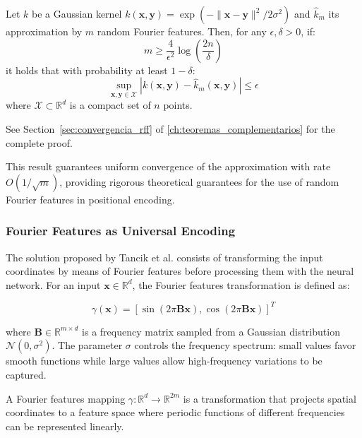 \begin{theorem}
Let $k$ be a Gaussian kernel $k(\mathbf{x}, \mathbf{y}) = \exp(-\|\mathbf{x} - \mathbf{y}\|^2 / 2\sigma^2)$ and $\hat{k}_m$ its approximation by $m$ random Fourier features. Then, for any $\epsilon, \delta > 0$, if:
\begin{equation}
m \geq \frac{4}{\epsilon^2} \log\left(\frac{2n}{\delta}\right)
\end{equation}
it holds that with probability at least $1 - \delta$:
\begin{equation}
\sup_{\mathbf{x}, \mathbf{y} \in \mathcal{X}} |k(\mathbf{x}, \mathbf{y}) - \hat{k}_m(\mathbf{x}, \mathbf{y})| \leq \epsilon
\end{equation}
where $\mathcal{X} \subset \mathbb{R}^d$ is a compact set of $n$ points.

See Section~\ref{sec:convergencia_rff} of \autoref{ch:teoremas_complementarios} for the complete proof.
\end{theorem}

This result guarantees uniform convergence of the approximation with rate $O(1/\sqrt{m})$, providing rigorous theoretical guarantees for the use of random Fourier features in positional encoding.

\subsubsection{Fourier Features as Universal Encoding}

The solution proposed by Tancik et al. consists of transforming the input coordinates by means of Fourier features before processing them with the neural network. For an input $\mathbf{x} \in \mathbb{R}^d$, the Fourier features transformation is defined as:

\begin{equation}
\gamma(\mathbf{x}) = \left[\sin(2\pi \mathbf{B}\mathbf{x}), \cos(2\pi \mathbf{B}\mathbf{x})\right]^T
\end{equation}

where $\mathbf{B} \in \mathbb{R}^{m \times d}$ is a frequency matrix sampled from a Gaussian distribution $\mathcal{N}(0, \sigma^2)$. The parameter $\sigma$ controls the frequency spectrum: small values favor smooth functions while large values allow high-frequency variations to be captured.

\begin{definition}
A Fourier features mapping $\gamma: \mathbb{R}^d \to \mathbb{R}^{2m}$ is a transformation that projects spatial coordinates to a feature space where periodic functions of different frequencies can be represented linearly.
\end{definition}

